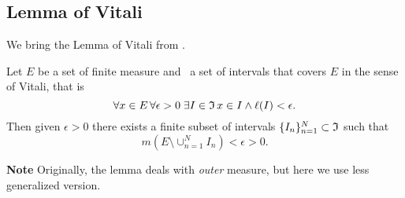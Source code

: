 \subsection{Lemma of Vitali}

We bring the 
Lemma of Vitali
from \cite{Royden}.

\begin{llem} \label{lem:vitali}
Let $E$ be a set of finite measure and \frakI\ a set of intervals
that covers $E$ in the sense of Vitali, that is
\begin{equation*}
\forall x\in E\, \forall \epsilon>0\;
 \exists I\in\mathfrak{I}\, x\in I \wedge \ell(I) < \epsilon.
\end{equation*}
Then given \(\epsilon>0\) there exists a finite subset of intervals 
\(\{I_n\}_{n=1}^N \subset \mathfrak{I}\) such that 
\begin{equation}
m\left(E \setminus \cup_{n=1}^N I_n\right) < \epsilon>0.
\end{equation}
\end{llem}

\textbf{Note} Originally, the lemma deals with \emph{outer} measure,
but here we use less generalized version.

